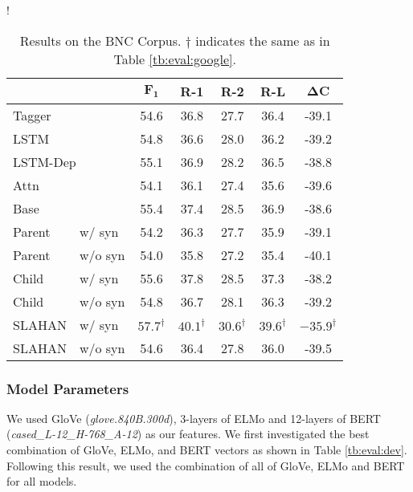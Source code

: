 \documentclass[letterpaper]{article} \usepackage{aaai20}  \usepackage{times}  \usepackage{helvet} \usepackage{courier}  \usepackage[hyphens]{url}  \usepackage{graphicx} \urlstyle{rm} \def\UrlFont{\rm}  \usepackage{graphicx}  \frenchspacing  \setlength{\pdfpagewidth}{8.5in}  \setlength{\pdfpageheight}{11in}  \usepackage{tabu}
\begin{document}
\begin{table}[t]
\centering
\small
\resizebox {0.825\columnwidth} {!} {
\begin{tabular}{llccccc}
\toprule
 & & $\mathbf{F_1}$ & \textbf{R-1} & \textbf{R-2} & \textbf{R-L} & $\mathbf{\Delta C}$ \\
\midrule
\multicolumn{2}{l}{Tagger}  & 54.6 & 36.8 & 27.7 & 36.4 & -39.1\\
\multicolumn{2}{l}{LSTM}    & 54.8 & 36.6 & 28.0 & 36.2 & -39.2\\
\multicolumn{2}{l}{LSTM-Dep}& 55.1 & 36.9 & 28.2 & 36.5 & -38.8\\
\multicolumn{2}{l}{Attn}    & 54.1 & 36.1 & 27.4 & 35.6 & -39.6\\
\multicolumn{2}{l}{Base}    & 55.4 & 37.4 & 28.5 & 36.9 & -38.6\\
Parent & w/ syn             & 54.2 & 36.3 & 27.7 & 35.9 & -39.1\\
Parent & w/o syn            & 54.0 & 35.8 & 27.2 & 35.4 & -40.1\\
\midrule
Child & w/ syn              & 55.6 & 37.8 & 28.5 & 37.3 & -38.2\\
Child & w/o syn             & 54.8 & 36.7 & 28.1 & 36.3 & -39.2\\
SLAHAN & w/ syn             & $\mathbf{57.7}^{\dagger}$ & $\mathbf{40.1}^{\dagger}$ & $\mathbf{30.6}^{\dagger}$ & $\mathbf{39.6}^{\dagger}$ & $\mathbf{-35.9}^{\dagger}$\\
SLAHAN & w/o syn            & 54.6 & 36.4 & 27.8 & 36.0 & -39.5\\
\bottomrule
\end{tabular}}
    \caption{Results on the BNC Corpus. $\dagger$ indicates the same as in Table \ref{tb:eval:google}.\label{tb:eval:bnc}}
\end{table}

\subsubsection{Model Parameters}

We used GloVe ({\sl glove.840B.300d}), 3-layers of ELMo and 12-layers of BERT ({\sl cased\_L-12\_H-768\_A-12}) as our features.
We first investigated the best combination of GloVe, ELMo, and BERT vectors as shown in Table \ref{tb:eval:dev}.
Following this result, we used the combination of all of GloVe, ELMo and BERT for all models.
\end{document}
